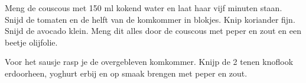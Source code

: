 \documentclass[a4paper]{recipe}
\begin{document}

Meng de couscous met 150 ml kokend water en laat haar vijf minuten staan. Snijd de tomaten en de helft van de komkommer in blokjes. Knip koriander fijn. Snijd de avocado klein. Meng dit alles door de couscous met peper en zout en een beetje olijfolie.

Voor het sausje rasp je de overgebleven komkommer. Knijp de 2 tenen knoflook erdoorheen, yoghurt erbij en op smaak brengen met peper en zout.
\end{document}
